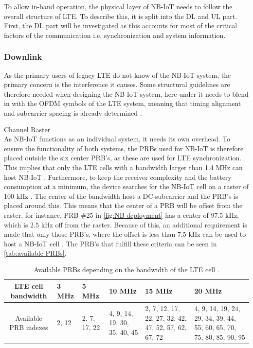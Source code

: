 To allow in-band operation, the physical layer of \gls{NB-IoT} needs to follow the overall structure of \gls{LTE}. To describe this, it is split into the \gls{DL} and \gls{UL} part. First, the \gls{DL} part will be investigated as this accounts for most of the critical factors of the communication i.e. synchronization and system information. 

\subsubsection{Downlink}
As the primary users of legacy \gls{LTE} do not know of the \gls{NB-IoT} system, the primary concern is the interference it causes. Some structural guidelines are therefore needed when designing the \gls{NB-IoT} system, here under it needs to blend in with the \gls{OFDM} symbols of the \gls{LTE} system, meaning that timing alignment and subcarrier spacing is already determined \citep[ch. 7.2]{NB-IoT_Book}. 

Channel Raster\\
As \gls{NB-IoT} functions as an individual system, it needs its own overhead. To ensure the functionality of both systems, the \gls{PRB}s used for \gls{NB-IoT} is therefore placed outside the six center \gls{PRB}'s, as these are used for LTE synchronization. This implies that only the LTE cells with a bandwidth larger than 1.4 MHz can host NB-IoT \citep{whitepaper}. Furthermore, to keep the receiver complexity and the battery consumption at a minimum, the device searches for the \gls{NB-IoT} cell on a raster of 100 kHz \citep[ch. 7.2]{NB-IoT_Book}. The center of the bandwidth host a DC-subcarrier and the \gls{PRB}'s is placed around this. This means that the center of a PRB will be offset from the raster, for instance, PRB \#25 in \autoref{fig:NB deployment} has a center of 97.5 kHz, which is 2.5 kHz off from the raster. Because of this, an additional requirement is made that only those \gls{PRB}'s, where the offset is less than 7.5 kHz can be used to host a NB-IoT cell \citep{primer}. The PRB's that fulfill these criteria can be seen in \autoref{tab:available-PRBs}. 

\begin{table}[H]
\centering
\begin{tabular}{|c|p{1.8cm}|p{1.8cm}|p{1.8cm}|p{1.8cm}|p{1.8cm}|}\hline
\textbf{LTE cell bandwidth}    & 3 MHz                & 5 MHz    & 10 MHz    & 15 MHz    & 20 MHz \\\hline
Available PRB indexes        & 2, 12    & 2, 7, 17, 22    & 4, 9, 14, 19, 30, 35, 40, 45 & 2, 7, 12, 17, 22, 27, 32, 42, 47, 52, 57, 62, 67, 72 & 4, 9, 14, 19, 24, 29, 34, 39, 44, 55, 60, 65, 70, 75, 80, 85, 90, 95 \\\hline
\end{tabular}
\caption{Available PRBs depending on the bandwidth of the LTE cell \citep{whitepaper}.}
\label{tab:available-PRBs}
\end{table}


